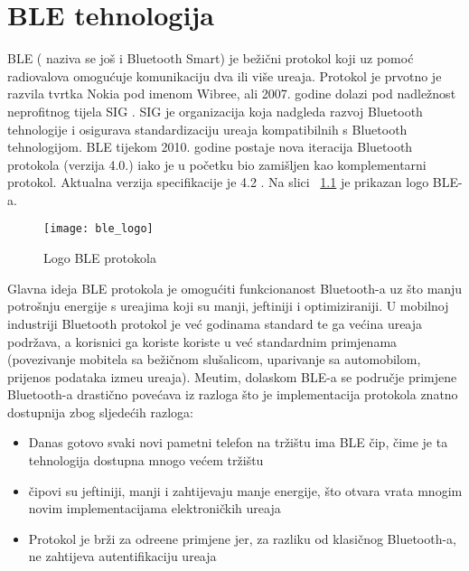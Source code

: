 
\chapter{BLE tehnologija}
BLE ( naziva se jo\v{s} i Bluetooth Smart) je be\v{z}i\v{c}ni protokol koji uz pomo\'{c} radiovalova omogu\'{c}uje komunikaciju dva ili vi\v{s}e ure\dj aja. Protokol je prvotno je razvila tvrtka Nokia pod imenom Wibree, ali 2007. godine dolazi pod nadle\v{z}nost neprofitnog tijela SIG \cite{sig}. SIG je organizacija koja nadgleda razvoj Bluetooth tehnologije i osigurava standardizaciju ure\dj aja kompatibilnih s Bluetooth tehnologijom. BLE tijekom 2010. godine postaje nova iteracija Bluetooth protokola (verzija 4.0.) iako je u po\v{c}etku bio zami\v{s}ljen kao komplementarni protokol. Aktualna verzija specifikacije je 4.2 \cite{ble_specification}. Na slici ~\ref{fig:ble} je prikazan logo BLE-a.

\begin{figure}[!htbp]
	\begin{center}
 \texttt{[image: ble\_logo]}
 \caption{Logo BLE protokola}
 \label{fig:ble}
	\end{center}
\end{figure}

Glavna ideja BLE protokola je omogu\'{c}iti funkcionanost Bluetooth-a uz \v{s}to manju potro\v{s}nju energije s ure\dj ajima koji su manji, jeftiniji i optimiziraniji. U mobilnoj industriji Bluetooth protokol je ve\'{c} godinama standard te ga ve\'{c}ina ure\dj aja podr\v{z}ava, a korisnici ga koriste koriste u ve\'{c} standardnim primjenama (povezivanje mobitela sa be\v{z}i\v{c}nom slu\v{s}alicom, uparivanje sa automobilom, prijenos podataka izme\dj u ure\dj aja). Me\dj utim, dolaskom BLE-a se podru\v{c}je primjene Bluetooth-a drasti\v{c}no pove\'{c}ava iz razloga \v{s}to je implementacija protokola znatno dostupnija zbog sljede\'{c}ih razloga:

\begin{itemize}
	\item Danas gotovo svaki novi pametni telefon na tr\v{z}i\v{s}tu ima BLE \v{c}ip, \v{c}ime je ta tehnologija dostupna mnogo ve\'{c}em tr\v{z}i\v{s}tu
	\item \v{c}ipovi su jeftiniji, manji i zahtijevaju manje energije, \v{s}to otvara vrata mnogim novim implementacijama elektroni\v{c}kih ure\dj aja
	\item Protokol je br\v{z}i za odre\dj ene primjene jer, za razliku od klasi\v{c}nog Bluetooth-a, ne zahtijeva autentifikaciju ure\dj aja
\end{itemize}



